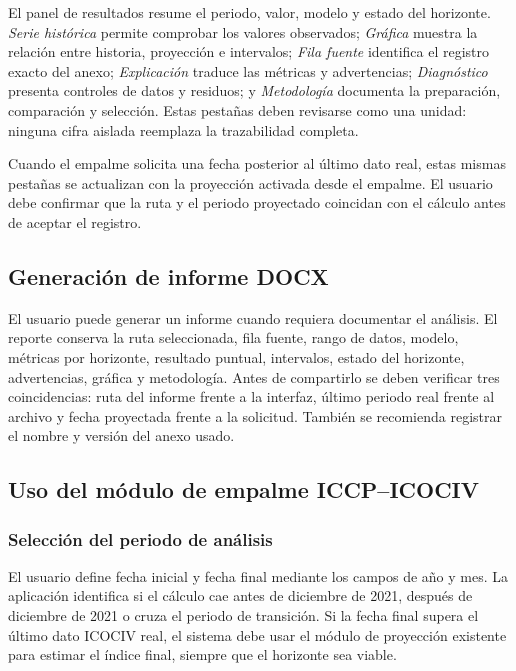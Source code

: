 \documentclass[12pt,letterpaper]{article}
\newcommand{\ICOCIV}{ICOCIV}
\begin{document}
El panel de resultados resume el periodo, valor, modelo y estado del horizonte. \textit{Serie histórica} permite comprobar los valores observados; \textit{Gráfica} muestra la relación entre historia, proyección e intervalos; \textit{Fila fuente} identifica el registro exacto del anexo; \textit{Explicación} traduce las métricas y advertencias; \textit{Diagnóstico} presenta controles de datos y residuos; y \textit{Metodología} documenta la preparación, comparación y selección. Estas pestañas deben revisarse como una unidad: ninguna cifra aislada reemplaza la trazabilidad completa.

Cuando el empalme solicita una fecha posterior al último dato real, estas mismas pestañas se actualizan con la proyección activada desde el empalme. El usuario debe confirmar que la ruta y el periodo proyectado coincidan con el cálculo antes de aceptar el registro.

\subsection{Generación de informe DOCX}

El usuario puede generar un informe cuando requiera documentar el análisis. El reporte conserva la ruta seleccionada, fila fuente, rango de datos, modelo, métricas por horizonte, resultado puntual, intervalos, estado del horizonte, advertencias, gráfica y metodología. Antes de compartirlo se deben verificar tres coincidencias: ruta del informe frente a la interfaz, último periodo real frente al archivo y fecha proyectada frente a la solicitud. También se recomienda registrar el nombre y versión del anexo usado.

\subsection{Uso del módulo de empalme ICCP--ICOCIV}

\subsubsection{Selección del periodo de análisis}

El usuario define fecha inicial y fecha final mediante los campos de año y mes. La aplicación identifica si el cálculo cae antes de diciembre de 2021, después de diciembre de 2021 o cruza el periodo de transición. Si la fecha final supera el último dato \ICOCIV{} real, el sistema debe usar el módulo de proyección existente para estimar el índice final, siempre que el horizonte sea viable.
\end{document}
